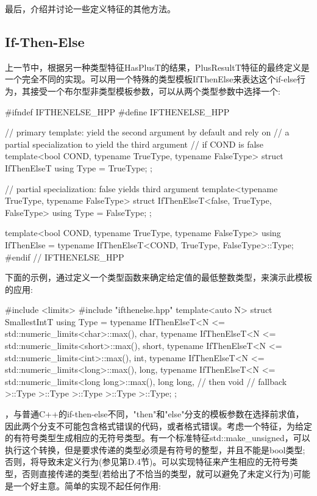 
最后，介绍并讨论一些定义特征的其他方法。

\subsection{If-Then-Else}

上一节中，根据另一种类型特征HasPlusT的结果，PlusResultT特征的最终定义是一个完全不同的实现。可以用一个特殊的类型模板IfThenElse来表达这个if-else行为，其接受一个布尔型非类型模板参数，可以从两个类型参数中选择一个:

\begin{cpp}
#ifndef IFTHENELSE_HPP
#define IFTHENELSE_HPP

// primary template: yield the second argument by default and rely on
// a partial specialization to yield the third argument
// if COND is false
template<bool COND, typename TrueType, typename FalseType>
struct IfThenElseT {
	using Type = TrueType;
};

// partial specialization: false yields third argument
template<typename TrueType, typename FalseType>
struct IfThenElseT<false, TrueType, FalseType> {
	using Type = FalseType;
};

template<bool COND, typename TrueType, typename FalseType>
using IfThenElse = typename IfThenElseT<COND, TrueType, FalseType>::Type;
#endif // IFTHENELSE_HPP
\end{cpp}

下面的示例，通过定义一个类型函数来确定给定值的最低整数类型，来演示此模板的应用:

\begin{cpp}
#include <limits>
#include "ifthenelse.hpp"
template<auto N>
struct SmallestIntT {
	using Type =
	typename IfThenElseT<N <= std::numeric_limits<char>::max(), char,
	typename IfThenElseT<N <= std::numeric_limits<short>::max(), short,
	typename IfThenElseT<N <= std::numeric_limits<int>::max(), int,
	typename IfThenElseT<N <= std::numeric_limits<long>::max(), long,
	typename IfThenElseT<N <= std::numeric_limits<long long>::max(),
	long long, // then
	void // fallback
	>::Type
	>::Type
	>::Type
	>::Type
	>::Type;
};
\end{cpp}

，与普通C++的if-then-else不同，"then"和"else"分支的模板参数在选择前求值，因此两个分支不可能包含格式错误的代码，或者格式错误。考虑一个特征，为给定的有符号类型生成相应的无符号类型。有一个标准特征std::make\_unsigned，可以执行这个转换，但是要求传递的类型必须是有符号的整型，并且不能是bool类型;否则，将导致未定义行为(参见第D.4节)。可以实现特征来产生相应的无符号类型，否则直接传递的类型(若给出了不恰当的类型，就可以避免了未定义行为)可能是一个好主意。简单的实现不起任何作用:

